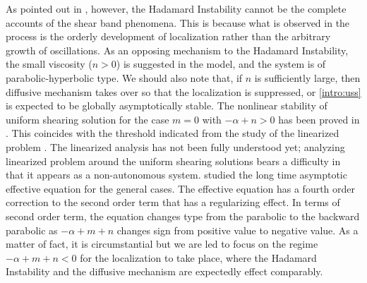 \documentclass[a4paper,11pt]{article}
\theoremstyle{remark}
\begin{document}
As pointed out in \cite{KOT14}, however, the Hadamard Instability cannot be the complete accounts of the shear band phenomena. This is because what is observed in the process is the orderly development of localization \cite{zener_effect_1944} rather than the arbitrary growth of oscillations. As an opposing mechanism to the Hadamard Instability, the small viscosity ($n>0$) is suggested in the model, and the system is of parabolic-hyperbolic type. We should also note that, if $n$ is sufficiently large, then diffusive mechanism takes over so that the localization is suppressed, or \eqref{intro:uss} is expected to be globally asymptotically stable. The nonlinear stability of uniform shearing solution for the case $m=0$ with $-\alpha+n>0$ has been proved in \cite{DH_1983, Tz_1986, tzavaras_strain_1991, KT09}. This coincides with the threshold indicated from the study of the linearized problem \cite{FM87}. The linearized analysis has not been fully understood yet; analyzing linearized problem around the uniform shearing solutions bears a difficulty in that it appears as a non-autonomous system. \cite{KT09} studied the long time asymptotic effective equation for the general cases. The effective equation has a fourth order correction to the second order term that has a regularizing effect. In terms of second order term, the equation changes type from the parabolic to the backward parabolic as $-\alpha+m+n$ changes sign from positive value to negative value. As a matter of fact, it is circumstantial but we are led to focus on the regime $-\alpha+m+n<0$ for the localization to take place, where the Hadamard Instability and the diffusive mechanism are expectedly effect comparably.%
\end{document}

